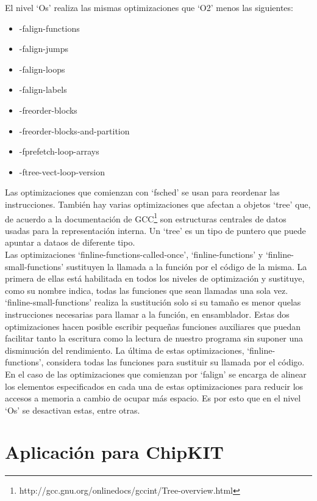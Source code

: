 El nivel `Os' realiza las mismas optimizaciones que `O2' menos las siguientes:
\begin{multicols}{2}
\begin{itemize}[noitemsep, topsep=0pt, parsep=0pt, partopsep=0pt]
	\item -falign-functions
	\item -falign-jumps
	\item -falign-loops
	\item -falign-labels
	\item -freorder-blocks
	\item -freorder-blocks-and-partition
	\item -fprefetch-loop-arrays
	\item -ftree-vect-loop-version
\end{itemize}
\end{multicols}

Las optimizaciones que comienzan con `fsched' se usan para reordenar las instrucciones. También hay varias optimizaciones que afectan a objetos `tree' que, de acuerdo a la documentación de GCC\footnote{http://gcc.gnu.org/onlinedocs/gccint/Tree-overview.html} son estructuras centrales de datos usadas para la representación interna. Un `tree' es un tipo de puntero que puede apuntar a dataos de diferente tipo.\\
Las optimizaciones `finline-functions-called-once', `finline-functions' y `finline-small-functions' sustituyen la llamada a la función por el código de la misma. La primera de ellas está habilitada en todos los niveles de optimización y sustituye, como su nombre indica, todas las funciones que sean llamadas una sola vez. `finline-small-functions' realiza la sustitución solo si su tamaño es menor quelas instrucciones necesarias para llamar a la función, en ensamblador. Estas dos optimizaciones hacen posible escribir pequeñas funciones auxiliares que puedan facilitar tanto la escritura como la lectura de nuestro programa sin suponer una disminución del rendimiento. La última de estas optimizaciones, `finline-functions', considera todas las funciones para sustituir su llamada por el código.\\
En el caso de las optimizaciones que comienzan por `falign'  se encarga de alinear los elementos especificados en cada una de estas optimizaciones para reducir los accesos a memoria a cambio de ocupar más espacio. Es por esto que en el nivel `Os' se desactivan estas, entre otras.

\newpage
\section{Aplicación para ChipKIT}

